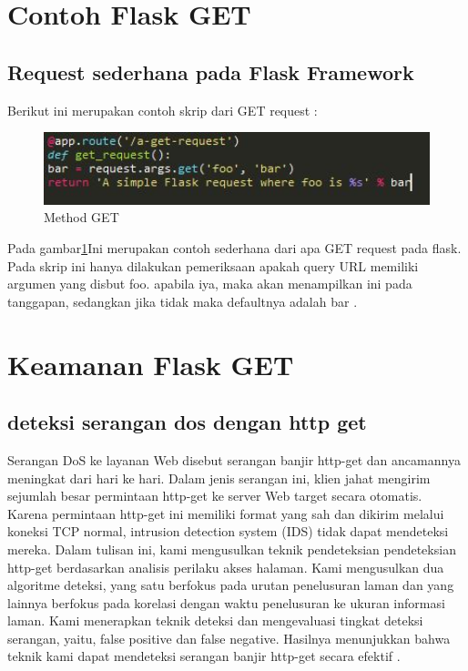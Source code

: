 \section{Contoh Flask GET}
\subsection{Request sederhana pada Flask Framework}
Berikut ini merupakan contoh skrip dari GET request :
\begin{figure}[ht]
\centerline{\includegraphics[width=1\textwidth]{figures/3FlaskGet.jpg}}
\caption{Method GET}
\label{labelgambar}
\end{figure}
Pada gambar\ref{labelgambar}Ini merupakan contoh sederhana dari apa GET request pada flask. Pada skrip ini hanya dilakukan pemeriksaan apakah query URL memiliki argumen yang disbut foo. apabila iya, maka akan menampilkan ini pada tanggapan, sedangkan jika tidak maka defaultnya adalah bar \cite{aggarwal2014flask}.

\section{Keamanan Flask GET}
\subsection{deteksi serangan dos dengan http get}
Serangan DoS ke layanan Web disebut serangan banjir http-get dan ancamannya meningkat dari hari ke hari. Dalam jenis serangan ini, klien jahat mengirim sejumlah besar permintaan http-get ke server Web target secara otomatis. Karena permintaan http-get ini memiliki format yang sah dan dikirim melalui koneksi TCP normal, intrusion detection system (IDS) tidak dapat mendeteksi mereka. Dalam tulisan ini, kami mengusulkan teknik pendeteksian pendeteksian http-get berdasarkan analisis perilaku akses halaman. Kami mengusulkan dua algoritme deteksi, yang satu berfokus pada urutan penelusuran laman dan yang lainnya berfokus pada korelasi dengan waktu penelusuran ke ukuran informasi laman. Kami menerapkan teknik deteksi dan mengevaluasi tingkat deteksi serangan, yaitu, false positive dan false negative. Hasilnya menunjukkan bahwa teknik kami dapat mendeteksi serangan banjir http-get secara efektif \cite{yatagai2007detection}.

